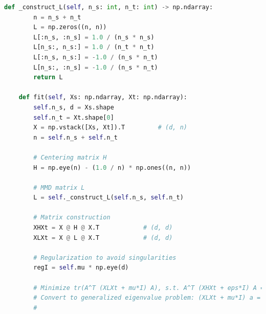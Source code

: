 \documentclass[a4paper]{CPIPC}
\numberwithin{equation}{section}
\begin{document}
\begin{lstlisting}[language=Python, caption=Transfer Learning with TCA]
    def _construct_L(self, n_s: int, n_t: int) -> np.ndarray:
        n = n_s + n_t
        L = np.zeros((n, n))
        L[:n_s, :n_s] = 1.0 / (n_s * n_s)
        L[n_s:, n_s:] = 1.0 / (n_t * n_t)
        L[:n_s, n_s:] = -1.0 / (n_s * n_t)
        L[n_s:, :n_s] = -1.0 / (n_s * n_t)
        return L

    def fit(self, Xs: np.ndarray, Xt: np.ndarray):
        self.n_s, d = Xs.shape
        self.n_t = Xt.shape[0]
        X = np.vstack([Xs, Xt]).T         # (d, n)
        n = self.n_s + self.n_t

        # Centering matrix H
        H = np.eye(n) - (1.0 / n) * np.ones((n, n))

        # MMD matrix L
        L = self._construct_L(self.n_s, self.n_t)

        # Matrix construction
        XHXt = X @ H @ X.T            # (d, d)
        XLXt = X @ L @ X.T            # (d, d)

        # Regularization to avoid singularities
        regI = self.mu * np.eye(d)

        # Minimize tr(A^T (XLXt + mu*I) A), s.t. A^T (XHXt + eps*I) A = I
        # Convert to generalized eigenvalue problem: (XLXt + mu*I) a = lambda (XHXt + eps*I) a
        #
\end{lstlisting}
    
\end{document}

